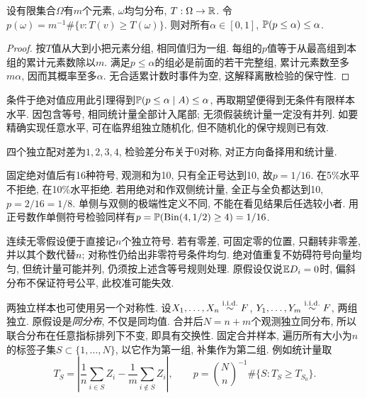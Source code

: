 \begin{lemma}[有限均匀样本的尾秩]
设有限集合$\Omega$有$m$个元素, $\omega$均匀分布, $T:\Omega\to\mathbb R$. 令$p(\omega)=m^{-1}\#\{v:T(v)\geq T(\omega)\}$. 则对所有$\alpha\in[0,1]$, $\mathbb P(p\leq\alpha)\leq\alpha$.
\end{lemma}
\begin{proof}
按$T$值从大到小把元素分组, 相同值归为一组. 每组的$p$值等于从最高组到本组的累计元素数除以$m$. 满足$p\leq\alpha$的组必是前面的若干完整组, 累计元素数至多$m\alpha$, 因而其概率至多$\alpha$. 无合适累计数时事件为空, 这解释离散检验的保守性.
\end{proof}
条件于绝对值应用此引理得到$\mathbb P(p\leq\alpha\mid A)\leq\alpha$, 再取期望便得到无条件有限样本水平. 因包含等号, 相同统计量全部计入尾部; 无须假装统计量一定没有并列. 如要精确实现任意水平, 可在临界组独立随机化, 但不随机化的保守规则已有效.

\begin{example}
四个独立配对差为$1,2,3,4$, 检验差分布关于0对称, 对正方向备择用和统计量.
\end{example}
\begin{solution}
固定绝对值后有16种符号, 观测和为10, 只有全正号达到10, 故$p=1/16$. 在5\%水平不拒绝, 在10\%水平拒绝. 若用绝对和作双侧统计量, 全正与全负都达到10, $p=2/16=1/8$. 单侧与双侧的极端性定义不同, 不能在看见结果后任选较小者. 用正号数作单侧符号检验同样有$p=\mathbb P(\operatorname{Bin}(4,1/2)\geq4)=1/16$.
\end{solution}
连续无零假设便于直接记$n$个独立符号. 若有零差, 可固定零的位置, 只翻转非零差, 并以其个数代替$n$; 对称性仍给出非零符号条件均匀. 绝对值重复不妨碍符号向量均匀, 但统计量可能并列, 仍须按上述含等号规则处理. 原假设仅说$\mathbb E D_i=0$时, 偏斜分布不保证符号公平, 此校准可能失效.

两独立样本也可使用另一个对称性. 设$X_1,\ldots,X_n\stackrel{\mathrm{i.i.d.}}{\sim} F$, $Y_1,\ldots,Y_m\stackrel{\mathrm{i.i.d.}}{\sim} F$, 两组独立. 原假设是\emph{同分布}, 不仅是同均值. 合并后$N=n+m$个观测独立同分布, 所以联合分布在任意指标排列下不变, 即具有交换性. 固定合并样本, 遍历所有大小为$n$的标签子集$S\subset\{1,\ldots,N\}$, 以它作为第一组, 补集作为第二组. 例如统计量取
\[
 T_S=\left|\frac1n\sum_{i\in S}Z_i-\frac1m\sum_{i\notin S}Z_i\right|,\qquad
 p=\binom Nn^{-1}\#\{S:T_S\geq T_{S_0}\}.
\]

